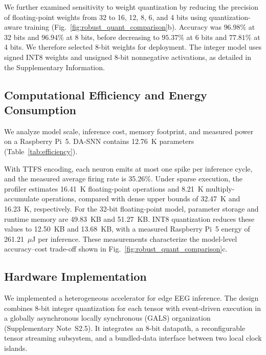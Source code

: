 \documentclass{nsr}
\begin{document}
We further examined sensitivity to weight quantization by reducing the precision of floating-point weights from 32 to 16, 12, 8, 6, and 4 bits using quantization-aware training (Fig.~\ref{fig:robust_quant_comparison}b). Accuracy was $96.98\%$ at 32 bits and $96.94\%$ at 8 bits, before decreasing to $95.37\%$ at 6 bits and $77.81\%$ at 4 bits. We therefore selected 8-bit weights for deployment. The integer model uses signed INT8 weights and unsigned 8-bit nonnegative activations, as detailed in the Supplementary Information.

\subsection{Computational Efficiency and Energy Consumption}

We analyze model scale, inference cost, memory footprint, and measured power on a Raspberry Pi~5. DA-SNN contains 12.76~K parameters (Table~\ref{tab:efficiency}).

With TTFS encoding, each neuron emits at most one spike per inference cycle, and the measured average firing rate is 35.26\%. Under sparse execution, the profiler estimates 16.41~K floating-point operations and 8.21~K multiply-accumulate operations, compared with dense upper bounds of 32.47~K and 16.23~K, respectively. For the 32-bit floating-point model, parameter storage and runtime memory are 49.83~KB and 51.27~KB. INT8 quantization reduces these values to 12.50~KB and 13.68~KB, with a measured Raspberry Pi~5 energy of 261.21~$\mu$J per inference. These measurements characterize the model-level accuracy--cost trade-off shown in Fig.~\ref{fig:robust_quant_comparison}c.


\subsection{Hardware Implementation}

We implemented a heterogeneous accelerator for edge EEG inference. The design combines 8-bit integer quantization for each tensor with event-driven execution in a globally asynchronous locally synchronous (GALS) organization (Supplementary Note~S2.5). It integrates an 8-bit datapath, a reconfigurable tensor streaming subsystem, and a bundled-data interface between two local clock islands.
\end{document}
